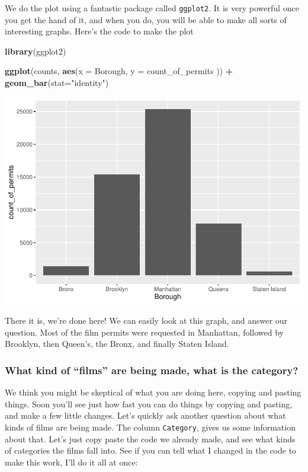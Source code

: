 \documentclass[]{book}
\newenvironment{Shaded}{\begin{snugshade}}{\end{snugshade}}
\newcommand{\KeywordTok}[1]{\textcolor[rgb]{0.13,0.29,0.53}{\textbf{#1}}}
\newcommand{\DataTypeTok}[1]{\textcolor[rgb]{0.13,0.29,0.53}{#1}}
\newcommand{\StringTok}[1]{\textcolor[rgb]{0.31,0.60,0.02}{#1}}
\newcommand{\OperatorTok}[1]{\textcolor[rgb]{0.81,0.36,0.00}{\textbf{#1}}}
\newcommand{\NormalTok}[1]{#1}
\begin{document}
We do the plot using a fantastic package called \texttt{ggplot2}. It is
very powerful once you get the hand of it, and when you do, you will be
able to make all sorts of interesting graphs. Here's the code to make
the plot

\begin{Shaded}
\begin{Highlighting}[]
\KeywordTok{library}\NormalTok{(ggplot2)}

\KeywordTok{ggplot}\NormalTok{(counts, }\KeywordTok{aes}\NormalTok{(}\DataTypeTok{x =}\NormalTok{ Borough, }\DataTypeTok{y =}\NormalTok{ count_of_permits )) }\OperatorTok{+}
\StringTok{  }\KeywordTok{geom_bar}\NormalTok{(}\DataTypeTok{stat=}\StringTok{"identity"}\NormalTok{)}
\end{Highlighting}
\end{Shaded}

\includegraphics{Statistics_Lab_files/figure-latex/1borough-1.pdf}

There it is, we're done here! We can easily look at this graph, and
answer our question. Most of the film permits were requested in
Manhattan, followed by Brooklyn, then Queen's, the Bronx, and finally
Staten Island.

\subsubsection{\texorpdfstring{What kind of ``films'' are being made,
what is the
category?}{What kind of films are being made, what is the category?}}\label{what-kind-of-films-are-being-made-what-is-the-category}

We think you might be skeptical of what you are doing here, copying and
pasting things. Soon you'll see just how fast you can do things by
copying and pasting, and make a few little changes. Let's quickly ask
another question about what kinds of films are being made. The column
\texttt{Category}, gives us some information about that. Let's just copy
paste the code we already made, and see what kinds of categories the
films fall into. See if you can tell what I changed in the code to make
this work, I'll do it all at once:
\end{document}
